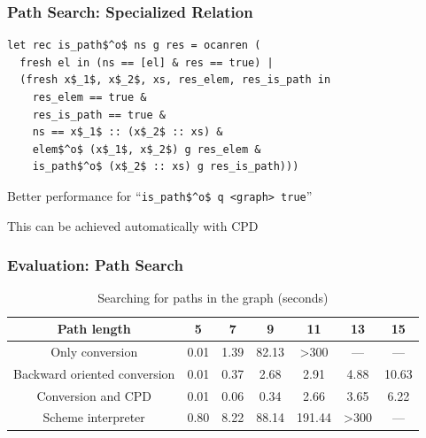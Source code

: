\documentclass[xcolor=table]{beamer}
\begin{document}
\begin{frame}[fragile]
  \transwipe[direction=90]
  \frametitle{Path Search: Specialized Relation}

\begin{lstlisting}[]
let rec is_path$^o$ ns g res = ocanren (
  fresh el in (ns == [el] & res == true) |
  (fresh x$_1$, x$_2$, xs, res_elem, res_is_path in
    res_elem == true &
    res_is_path == true &
    ns == x$_1$ :: (x$_2$ :: xs) &
    elem$^o$ (x$_1$, x$_2$) g res_elem &
    is_path$^o$ (x$_2$ :: xs) g res_is_path)))
\end{lstlisting}

\vspace{16pt}

Better performance for ``\lstinline{is_path$^o$ q <graph> true}''

\pause
\vspace{10pt}

This can be achieved automatically with CPD


\end{frame}

\begin{frame}[fragile]
  \transwipe[direction=90]
  \frametitle{Evaluation: Path Search}

\begin{table}
\footnotesize
\centering
\begin{tabular}{c|c|c|c|c|c|c}
Path length                   & 5      & 7     & 9      & 11      & 13     & 15        \\
\hline\hline
Only conversion               & 0.01  & 1.39 &  82.13 & >300     & ---      & ---     \\
\hline
Backward oriented conversion  & 0.01 & 0.37 &  2.68 & 2.91   & 4.88    & 10.63   \\
\hline
Conversion and CPD            & 0.01  & 0.06 &  0.34 & 2.66   & 3.65    & 6.22  \\
\hline
Scheme interpreter            & 0.80  & 8.22 & 88.14 & 191.44 & >300   & ---   \\
\end{tabular}

 \caption{Searching for paths in the graph (seconds)}
    \label{tab:is_path}
\end{table}
\end{frame}
\end{document}
